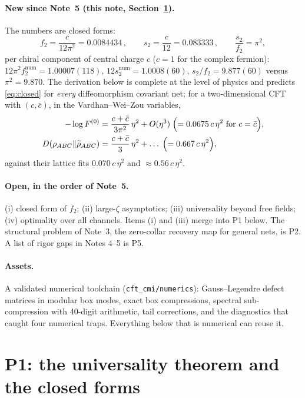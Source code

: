 \documentclass[11pt]{article}
\theoremstyle{accent}
\theoremstyle{definition}
\begin{document}
\paragraph{New since Note~5 (this note, Section~\ref{sec:P1}).}
The numbers are closed forms:
\begin{equation}\label{eq:closed}
 \boxed{\ f_2=\frac{c}{12\pi^2}=0.0084434\,,\qquad s_2=\frac{c}{12}=0.083333\,,\qquad \frac{s_2}{f_2}=\pi^2,\ }
\end{equation}
per chiral component of central charge \(c\) (\(c=1\) for the complex fermion): \(12\pi^2f_2^{\mathrm{num}}=1.00007(118)\), \(12s_2^{\mathrm{num}}=1.0008(60)\), \(s_2/f_2=9.877(60)\) versus \(\pi^2=9.870\).  The derivation below is complete at the level of physics and predicts \eqref{eq:closed} for \emph{every} diffeomorphism covariant net; for a two-dimensional CFT with \((c,\bar c)\), in the Vardhan--Wei--Zou variables,
\begin{align}
 -\log F^{(0)}&=\frac{c+\bar c}{3\pi^2}\,\eta^2+O(\eta^3)\;\Bigl(=0.0675\,c\,\eta^2\ \text{for }c=\bar c\Bigr),\label{eq:vwz-closed}\\
 D(\rho_{ABC}\Vert\widetilde\rho_{ABC})&=\frac{c+\bar c}{3}\,\eta^2+\dots\;\Bigl(=0.667\,c\,\eta^2\Bigr),\notag
\end{align}
against their lattice fits \(0.070\,c\,\eta^2\) and \(\approx0.56\,c\,\eta^2\).

\paragraph{Open, in the order of Note~5.}
(i) closed form of \(f_2\); (ii) large-\(\zeta\) asymptotics; (iii) universality beyond free fields; (iv) optimality over all channels.  Items (i) and (iii) merge into P1 below.  The structural problem of Note~3, the zero-collar recovery map for general nets, is P2.  A list of rigor gaps in Notes 4--5 is P5.

\paragraph{Assets.}
A validated numerical toolchain (\texttt{cft\_cmi/numerics}): Gauss--Legendre defect matrices in modular box modes, exact box compressions, spectral sub-compression with 40-digit arithmetic, tail corrections, and the diagnostics that caught four numerical traps.  Everything below that is numerical can reuse it.
\section{P1: the universality theorem and the closed forms}\label{sec:P1}
\end{document}
